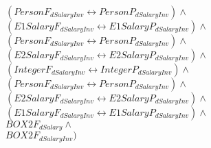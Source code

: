 \documentclass[a4paper,10pt]{article}
\begin{document}
 $ (PersonF_{dSalaryInv} \leftrightarrow PersonP_{dSalaryInv}) \land $ \\ 
 $ (E1SalaryF_{dSalaryInv} \leftrightarrow E1SalaryP_{dSalaryInv}) \land $ \\ 
 $ (PersonF_{dSalaryInv} \leftrightarrow PersonP_{dSalaryInv}) \land $ \\ 
 $ (E2SalaryF_{dSalaryInv} \leftrightarrow E2SalaryP_{dSalaryInv}) \land $ \\ 
 $ (IntegerF_{dSalaryInv} \leftrightarrow IntegerP_{dSalaryInv}) \land $ \\ 
 $ (PersonF_{dSalaryInv} \leftrightarrow PersonP_{dSalaryInv}) \land $ \\ 
 $ (E2SalaryF_{dSalaryInv} \leftrightarrow E2SalaryP_{dSalaryInv}) \land $ \\ 
 $ (E1SalaryF_{dSalaryInv} \leftrightarrow E1SalaryP_{dSalaryInv}) \land $ \\ 
 $ BOX2F_{dSalary} \land $ \\ 
 $ BOX2F_{dSalaryInv})$ 
\end{document}
